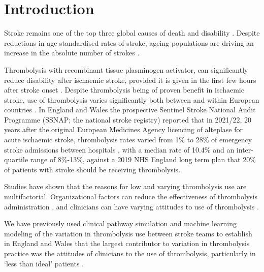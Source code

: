 \section{Introduction}



Stroke remains one of the top three global causes of death and disability \cite{feigin_global_2021}. Despite reductions in age-standardised rates of stroke, ageing populations are driving an increase in the absolute number of strokes \cite{feigin_global_2021}. 


Thrombolysis with recombinant tissue plasminogen activator, can significantly reduce disability after ischaemic stroke, provided it is given in the first few hours after stroke onset \cite{emberson_effect_2014}. Despite thrombolysis being of proven benefit in ischaemic stroke, use of thrombolysis varies significantly both between and within European countries \cite{aguiar_de_sousa_access_2019}. In England and Wales the prospective Sentinel Stroke National Audit Programme (SSNAP; the national stroke registry) reported that in 2021/22, 20 years after the original European Medicines Agency licencing of alteplase for acute ischaemic stroke, thrombolysis rates varied from 1\% to 28\% of emergency stroke admissions between hospitals \cite{sentinel_national_stroke_audit_programme_ssnap_2022}, with a median rate of 10.4\% and an inter-quartile range of 8\%-13\%, against a 2019 NHS England long term plan that 20\% of patients with stroke should be receiving thrombolysis\cite{nhs_long_term_plan_2019}.


Studies have shown that the reasons for low and varying thrombolysis use are multifactorial. Organizational factors can reduce the effectiveness of thrombolysis administration \cite{aguiar_de_sousa_access_2019}, and clinicians can have varying attitudes to use of thrombolysis \cite{de_brun_factors_2018}.

We have previously used clinical pathway simulation and machine learning modeling of the variation in thrombolysis use between stroke teams to establish in England and Wales that the largest contributor to variation in thrombolysis practice was the attitudes of clinicians to the use of thrombolysis, particularly in ‘less than ideal’ patients \cite{pearn_what_2023, allen_use_2022}.

